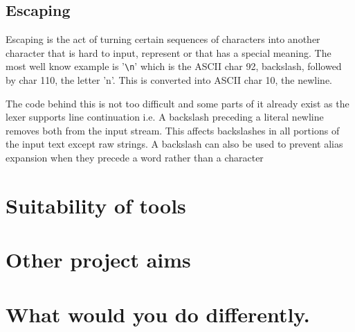 \subsection{Escaping}
Escaping is the act of turning certain sequences of characters into another character that is hard to input, represent or that has a special meaning.
The most well know example is '\verb!\n!' which is the ASCII char 92, backslash, followed by char 110, the letter 'n'.
This is converted into ASCII char 10, the newline.

The code behind this is not too difficult and some parts of it already exist as the lexer supports line continuation i.e. A backslash preceding a literal newline removes both from the input stream.
This affects backslashes in all portions of the input text except raw strings.
A backslash can also be used to prevent alias expansion when they precede a word rather than a character



\section{Suitability of tools}

\section{Other project aims}

\section{What would you do differently.}













